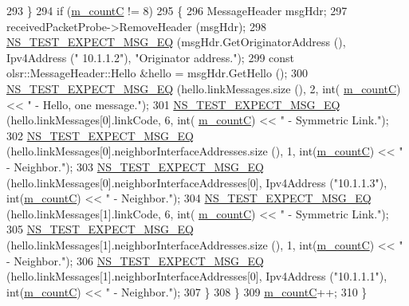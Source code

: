 \begin{DoxyCode}
293         \}
294       \textcolor{keywordflow}{if} (\hyperlink{classns3_1_1olsr_1_1TcRegressionTest_a7ff866c3417a672eb3bb43f08a399eaa}{m\_countC} != 8)
295         \{
296           MessageHeader msgHdr;
297           receivedPacketProbe->RemoveHeader (msgHdr);
298           \hyperlink{group__testing_ga7304ba46a28d8cf08dfdfd6499cf7068}{NS\_TEST\_EXPECT\_MSG\_EQ} (msgHdr.GetOriginatorAddress (), Ipv4Address (\textcolor{stringliteral}{"
      10.1.1.2"}), \textcolor{stringliteral}{"Originator address."});
299           \textcolor{keyword}{const} olsr::MessageHeader::Hello &hello = msgHdr.GetHello ();
300           \hyperlink{group__testing_ga7304ba46a28d8cf08dfdfd6499cf7068}{NS\_TEST\_EXPECT\_MSG\_EQ} (hello.linkMessages.size (), 2, int(
      \hyperlink{classns3_1_1olsr_1_1TcRegressionTest_a7ff866c3417a672eb3bb43f08a399eaa}{m\_countC}) << \textcolor{stringliteral}{" - Hello, one message."});
301           \hyperlink{group__testing_ga7304ba46a28d8cf08dfdfd6499cf7068}{NS\_TEST\_EXPECT\_MSG\_EQ} (hello.linkMessages[0].linkCode, 6, \textcolor{keywordtype}{int}(
      \hyperlink{classns3_1_1olsr_1_1TcRegressionTest_a7ff866c3417a672eb3bb43f08a399eaa}{m\_countC}) << \textcolor{stringliteral}{" - Symmetric Link."});
302           \hyperlink{group__testing_ga7304ba46a28d8cf08dfdfd6499cf7068}{NS\_TEST\_EXPECT\_MSG\_EQ} (hello.linkMessages[0].neighborInterfaceAddresses.size
       (), 1, int(\hyperlink{classns3_1_1olsr_1_1TcRegressionTest_a7ff866c3417a672eb3bb43f08a399eaa}{m\_countC}) << \textcolor{stringliteral}{" - Neighbor."});
303           \hyperlink{group__testing_ga7304ba46a28d8cf08dfdfd6499cf7068}{NS\_TEST\_EXPECT\_MSG\_EQ} (hello.linkMessages[0].neighborInterfaceAddresses[0], 
      Ipv4Address (\textcolor{stringliteral}{"10.1.1.3"}), \textcolor{keywordtype}{int}(\hyperlink{classns3_1_1olsr_1_1TcRegressionTest_a7ff866c3417a672eb3bb43f08a399eaa}{m\_countC}) << \textcolor{stringliteral}{" - Neighbor."});
304           \hyperlink{group__testing_ga7304ba46a28d8cf08dfdfd6499cf7068}{NS\_TEST\_EXPECT\_MSG\_EQ} (hello.linkMessages[1].linkCode, 6, \textcolor{keywordtype}{int}(
      \hyperlink{classns3_1_1olsr_1_1TcRegressionTest_a7ff866c3417a672eb3bb43f08a399eaa}{m\_countC}) << \textcolor{stringliteral}{" - Symmetric Link."});
305           \hyperlink{group__testing_ga7304ba46a28d8cf08dfdfd6499cf7068}{NS\_TEST\_EXPECT\_MSG\_EQ} (hello.linkMessages[1].neighborInterfaceAddresses.size
       (), 1, int(\hyperlink{classns3_1_1olsr_1_1TcRegressionTest_a7ff866c3417a672eb3bb43f08a399eaa}{m\_countC}) << \textcolor{stringliteral}{" - Neighbor."});
306           \hyperlink{group__testing_ga7304ba46a28d8cf08dfdfd6499cf7068}{NS\_TEST\_EXPECT\_MSG\_EQ} (hello.linkMessages[1].neighborInterfaceAddresses[0], 
      Ipv4Address (\textcolor{stringliteral}{"10.1.1.1"}), \textcolor{keywordtype}{int}(\hyperlink{classns3_1_1olsr_1_1TcRegressionTest_a7ff866c3417a672eb3bb43f08a399eaa}{m\_countC}) << \textcolor{stringliteral}{" - Neighbor."});
307         \}
308     \}
309   \hyperlink{classns3_1_1olsr_1_1TcRegressionTest_a7ff866c3417a672eb3bb43f08a399eaa}{m\_countC}++;
310 \}
\end{DoxyCode}


